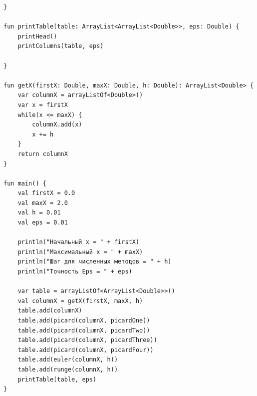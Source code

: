 \begin{lstlisting}
}

fun printTable(table: ArrayList<ArrayList<Double>>, eps: Double) {
    printHead()
    printColumns(table, eps)

}

fun getX(firstX: Double, maxX: Double, h: Double): ArrayList<Double> {
    var columnX = arrayListOf<Double>()
    var x = firstX
    while(x <= maxX) {
        columnX.add(x)
        x += h
    }
    return columnX
}

fun main() {
    val firstX = 0.0
    val maxX = 2.0
    val h = 0.01
    val eps = 0.01

    println("Начальный x = " + firstX)
    println("Максимальный x = " + maxX)
    println("Шаг для численных методов = " + h)
    println("Точность Eps = " + eps)

    var table = arrayListOf<ArrayList<Double>>()
    val columnX = getX(firstX, maxX, h)
    table.add(columnX)
    table.add(picard(columnX, picardOne))
    table.add(picard(columnX, picardTwo))
    table.add(picard(columnX, picardThree))
    table.add(picard(columnX, picardFour))
    table.add(euler(columnX, h))
    table.add(runge(columnX, h))
    printTable(table, eps)
}
\end{lstlisting}

